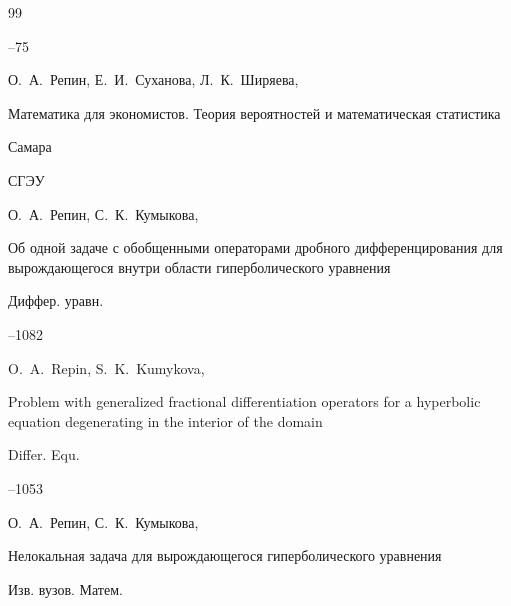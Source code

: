 \begin{thebibliography}{99}

--75









\by О.~А.~Репин, Е.~И.~Суханова, Л.~К.~Ширяева,

\book  Математика для экономистов. Теория вероятностей и математическая статистика

\publaddr Самара

\publ СГЭУ





\by О.~А.~Репин, С.~К.~Кумыкова,

\paper Об одной задаче с обобщенными операторами дробного дифференцирования для вырождающегося внутри области гиперболического уравнения 

\jour Диффер. уравн. 




--1082

\transl

\by O.~A.~Repin, S.~K.~Kumykova,  	

\paper Problem with generalized fractional differentiation operators for a hyperbolic equation degenerating in the interior of the domain

\jour Differ. Equ.



--1053 






\by О.~А.~Репин, С.~К.~Кумыкова,

\paper Нелокальная задача для вырождающегося гиперболического уравнения

\jour Изв. вузов. Матем.


\end{thebibliography}
